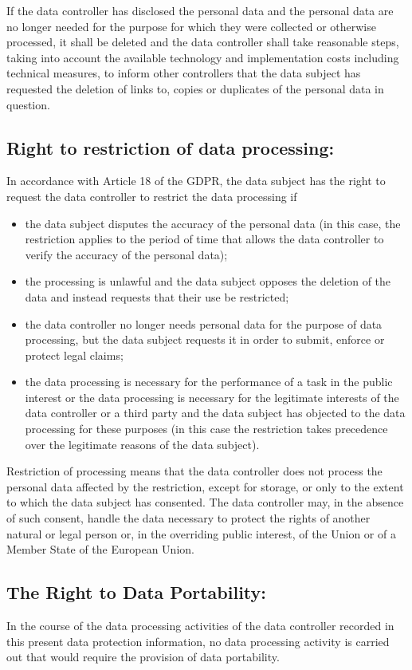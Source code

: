 \documentclass[11pt]{article}
\begin{document}
If the data controller has disclosed the personal data and the personal data are no longer needed for the purpose for which they were collected or otherwise processed, it shall be deleted and the data controller shall take reasonable steps, taking into account the available technology and implementation costs including technical measures, to inform other controllers that the data subject has requested the deletion of links to, copies or duplicates of the personal data in question. 

\subsection{Right to restriction of data processing:}
In accordance with Article 18 of the GDPR, the data subject has the right to request the data controller to restrict the data processing if
\begin{itemize}
    \item the data subject disputes the accuracy of the personal data (in this case, the restriction applies to the period of time that allows the data controller to verify the accuracy of the personal data);
    \item the processing is unlawful and the data subject opposes the deletion of the data and instead requests that their use be restricted;
    \item the data controller no longer needs personal data for the purpose of data processing, but the data subject requests it in order to submit, enforce or protect legal claims;
    \item the data processing is necessary for the performance of a task in the public interest or the data processing is necessary for the legitimate interests of the data controller or a third party and the data subject has objected to the data processing for these purposes (in this case the restriction takes precedence over the legitimate reasons of the data subject).
\end{itemize}

Restriction of processing means that the data controller does not process the personal data affected by the restriction, except for storage, or only to the extent to which the data subject has consented. The data controller may, in the absence of such consent, handle the data necessary to protect the rights of another natural or legal person or, in the overriding public interest, of the Union or of a Member State of the European Union. 

\subsection{The Right to Data Portability:}
In the course of the data processing activities of the data controller recorded in this present data protection information, no data processing activity is carried out that would require the provision of data portability.
\end{document}
